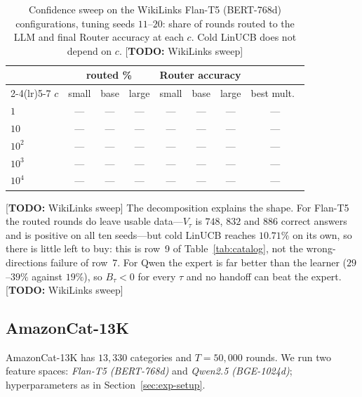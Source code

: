\documentclass{article}
\theoremstyle{definition}
\theoremstyle{remark}
\theoremstyle{remark}
\newcommand{\todo}[1]{\textcolor{red!70!black}{[\textbf{TODO:} #1]}}
\begin{document}
\begin{table}[h]
\centering
\caption{Confidence sweep on the WikiLinks Flan-T5 (BERT-768d) configurations,
tuning seeds $11$--$20$: share of rounds routed to the LLM and final Router
accuracy at each $c$. Cold LinUCB does not depend on $c$. \todo{WikiLinks sweep}}
\label{tab:wiki-csweep}
\scriptsize
\setlength{\tabcolsep}{4pt}
\begin{tabular}{@{}lccccccc@{}}
\toprule
& \multicolumn{3}{c}{routed \%} & \multicolumn{3}{c}{Router accuracy} & \\
\cmidrule(lr){2-4}\cmidrule(lr){5-7}
$c$ & small & base & large & small & base & large & best mult.\ \\
\midrule
$1$ & --- & --- & --- & --- & --- & --- & --- \\
$10$ & --- & --- & --- & --- & --- & --- & --- \\
$10^2$ & --- & --- & --- & --- & --- & --- & --- \\
$10^3$ & --- & --- & --- & --- & --- & --- & --- \\
$10^4$ & --- & --- & --- & --- & --- & --- & --- \\
\bottomrule
\end{tabular}
\end{table}

\todo{WikiLinks sweep} The decomposition explains the shape. For Flan-T5 the routed rounds do leave
usable data---$V_\tau$ is $748$, $832$ and $886$ correct answers and is
positive on all ten seeds---but cold LinUCB reaches $10.71\%$ on its own, so
there is little left to buy: this is row~9 of Table~\ref{tab:catalog}, not the
wrong-directions failure of row~7. For Qwen the expert is far better than the
learner ($29$--$39\%$ against $19\%$), so $B_\tau<0$ for every $\tau$ and no
handoff can beat the expert. \todo{WikiLinks sweep}

\subsection{AmazonCat-13K}
\label{sec:amazon}

AmazonCat-13K has $13{,}330$ categories and $T=50{,}000$ rounds. We run two
feature spaces: \emph{Flan-T5 (BERT-768d)} and \emph{Qwen2.5 (BGE-1024d)};
hyperparameters as in Section~\ref{sec:exp-setup}.
\end{document}
